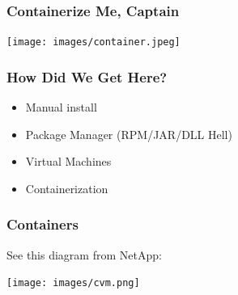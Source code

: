 \begin{frame}
\frametitle{Containerize Me, Captain}

\begin{center}
	\texttt{[image: images/container.jpeg]}
\end{center}

\end{frame}


\begin{frame}
\frametitle{How Did We Get Here?}

\begin{itemize}
	\item Manual install
	\item Package Manager (RPM/JAR/DLL Hell)
	\item Virtual Machines
	\item Containerization
\end{itemize}


\end{frame}


\begin{frame}
\frametitle{Containers}

See this diagram from NetApp:

\begin{center}
	\texttt{[image: images/cvm.png]}
\end{center}


\end{frame}








